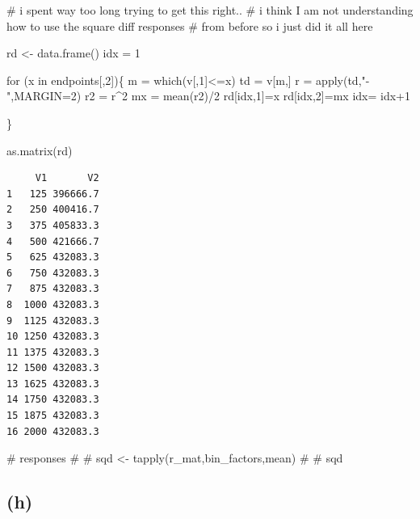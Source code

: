 \documentclass[
  letterpaper,
  DIV=11,
  numbers=noendperiod]{scrartcl}
\newenvironment{Shaded}{\begin{snugshade}}{\end{snugshade}}
\newcommand{\AttributeTok}[1]{\textcolor[rgb]{0.40,0.45,0.13}{#1}}
\newcommand{\CommentTok}[1]{\textcolor[rgb]{0.37,0.37,0.37}{#1}}
\newcommand{\ControlFlowTok}[1]{\textcolor[rgb]{0.00,0.23,0.31}{#1}}
\newcommand{\DecValTok}[1]{\textcolor[rgb]{0.68,0.00,0.00}{#1}}
\newcommand{\FunctionTok}[1]{\textcolor[rgb]{0.28,0.35,0.67}{#1}}
\newcommand{\NormalTok}[1]{\textcolor[rgb]{0.00,0.23,0.31}{#1}}
\newcommand{\OtherTok}[1]{\textcolor[rgb]{0.00,0.23,0.31}{#1}}
\newcommand{\SpecialCharTok}[1]{\textcolor[rgb]{0.37,0.37,0.37}{#1}}
\newcommand{\StringTok}[1]{\textcolor[rgb]{0.13,0.47,0.30}{#1}}
\begin{document}
\begin{Shaded}
\begin{Highlighting}[]
\CommentTok{\# i spent way too long trying to get this right..}
\CommentTok{\# i think I am not understanding how to use the square diff responses}
\CommentTok{\# from before so i just did it all here}

\NormalTok{rd }\OtherTok{\textless{}{-}} \FunctionTok{data.frame}\NormalTok{()}
\NormalTok{idx }\OtherTok{=} \DecValTok{1}



\ControlFlowTok{for}\NormalTok{ (x }\ControlFlowTok{in}\NormalTok{ endpoints[,}\DecValTok{2}\NormalTok{])\{}
\NormalTok{  m }\OtherTok{=} \FunctionTok{which}\NormalTok{(v[,}\DecValTok{1}\NormalTok{]}\SpecialCharTok{\textless{}=}\NormalTok{x)}
\NormalTok{  td }\OtherTok{=}\NormalTok{ v[m,]}
\NormalTok{  r }\OtherTok{=} \FunctionTok{apply}\NormalTok{(td,}\StringTok{"{-}"}\NormalTok{,}\AttributeTok{MARGIN=}\DecValTok{2}\NormalTok{)}
\NormalTok{  r2 }\OtherTok{=}\NormalTok{ r}\SpecialCharTok{\^{}}\DecValTok{2}
\NormalTok{  mx }\OtherTok{=} \FunctionTok{mean}\NormalTok{(r2)}\SpecialCharTok{/}\DecValTok{2}
\NormalTok{  rd[idx,}\DecValTok{1}\NormalTok{]}\OtherTok{=}\NormalTok{x}
\NormalTok{  rd[idx,}\DecValTok{2}\NormalTok{]}\OtherTok{=}\NormalTok{mx}
\NormalTok{  idx}\OtherTok{=}\NormalTok{ idx}\SpecialCharTok{+}\DecValTok{1}
  
\NormalTok{\}}

\FunctionTok{as.matrix}\NormalTok{(rd)}
\end{Highlighting}
\end{Shaded}

\begin{verbatim}
     V1       V2
1   125 396666.7
2   250 400416.7
3   375 405833.3
4   500 421666.7
5   625 432083.3
6   750 432083.3
7   875 432083.3
8  1000 432083.3
9  1125 432083.3
10 1250 432083.3
11 1375 432083.3
12 1500 432083.3
13 1625 432083.3
14 1750 432083.3
15 1875 432083.3
16 2000 432083.3
\end{verbatim}

\begin{Shaded}
\begin{Highlighting}[]
\CommentTok{\# responses}
\CommentTok{\# }
\CommentTok{\# sqd \textless{}{-} tapply(r\_mat,bin\_factors,mean)}
\CommentTok{\# }
\CommentTok{\# sqd}
\end{Highlighting}
\end{Shaded}

\hypertarget{h}{%
\subsection{(h)}\label{h}}
\end{document}
